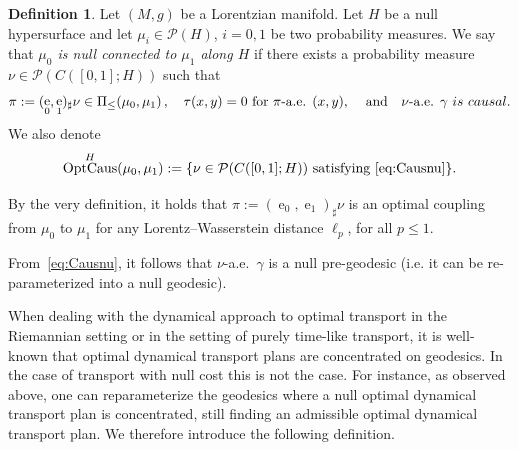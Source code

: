 \documentclass[12pt,a4paper]{amsart}
\theoremstyle{plain}
\theoremstyle{definition}
\newtheorem{definition}[lemma]{Definition}
\numberwithin{equation}{section}
\DeclareMathOperator{\OptCaus}{OptCaus}
\DeclareMathOperator{\ee}{e}
\newcommand{\Prob}{\mathcal P}
\begin{document}
\begin{definition}
  \label{defn:inside}
Let $(M,g)$ be a Lorentzian manifold.
  Let $H$ be a null hypersurface and let $\mu_i\in\Prob(H)$, $i=0,1$ be
  two probability measures.
  We say that \emph{$\mu_0$ is null connected to $\mu_1$ along $H$}  if there
  exists a probability measure  $\nu \in \mathcal{P}(C([0,1];H ))$  such that
  \begin{equation}\label{eq:Causnu}
  \pi:=(\ee_{0},\ee_{1})_{\sharp} \nu\in \Pi_{\leq}(\mu_0, \mu_1)\,,\quad \tau(x,y)=0 \text{ for $\pi$-a.e. $(x,y)$, }\quad \text{and}\quad \nu\text{-a.e. } \gamma {\rm\ is \ causal}.
  \end{equation}
  We also denote
  \begin{equation}\label{def:OptCaus}
\OptCaus^H(\mu_0,\mu_1) := \{ \nu \in \mathcal{P}(C([0,1];H )) \text{ satisfying~\eqref{eq:Causnu}}\}.
\end{equation}
\end{definition}
%
By the very definition, it holds that $\pi:=(\ee_{0},\ee_{1})_{\sharp}
\nu$ is an optimal coupling from $\mu_0$ to $\mu_1$ for  any
Lorentz--Wasserstein distance $\ell_p$, for all $p\leq 1$.
%

From~\eqref{eq:Causnu}, it follows that $\nu$-a.e.\ $\gamma$ is a null pre-geodesic 
(i.e. it can be re-parameterized into a null geodesic).

When dealing with the dynamical approach to optimal transport in the
Riemannian setting or in the setting of purely time-like transport,
it is well-known that optimal dynamical transport plans are
concentrated on geodesics.
%
In the case of transport with null cost this is not the case.
%
For instance, as observed above, one can reparameterize the geodesics where a null optimal
dynamical transport plan is concentrated, still finding an admissible
optimal dynamical transport plan.
%
We therefore introduce the following definition.
\end{document}
